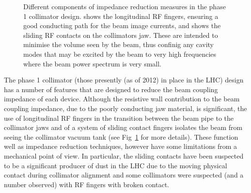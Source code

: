 \begin{figure}
\begin{center}

\end{center}
\caption{Different components of impedance reduction measures in the phase 1 collimator design.  shows the longitudinal RF fingers, ensuring a good conducting path for the beam image currents, and  shows the sliding RF contacts on the collimators jaw. These are intended to minimise the volume seen by the beam, thus confinig any cavity modes that may be excited by the beam to very high frequencies where the beam power spectrum is very small.}
\label{fig:phase-1-rf}
\end{figure}

The phase 1 collimator (those presently (as of 2012) in place in the LHC) design has a number of features that are designed to reduce the beam coupling impedance of each device. Although the resistive wall contribution to the beam coupling impedance, due to the poorly conducting jaw material, is significant, the use of longitudinal RF fingers in the transition between the beam pipe to the collimator jaws and of a system of sliding contact fingers isolates the beam from seeing the collimator vacuum tank (see Fig~\ref{fig:phase-1-rf} for more details). These function well as impedance reduction techniques, however have some limitations from a mechanical point of view. In particular, the sliding contacts have been suspected to be a significant producer of dust in the LHC due to the moving physical contact during collimator alignment and some collimators were suspected (and a number observed) with RF fingers with broken contact. 

